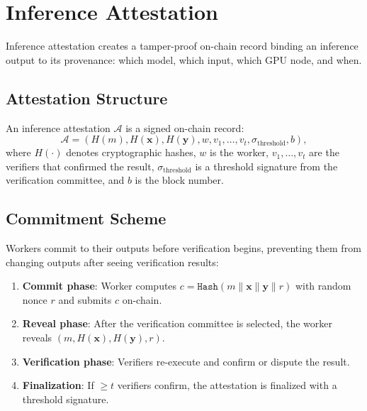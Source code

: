 \section{Inference Attestation}

\label{sec:attestation}

Inference attestation creates a tamper-proof on-chain record binding an
inference output to its provenance: which model, which input, which GPU node,
and when.

\subsection{Attestation Structure}

\begin{definition}
An inference attestation $\mathcal{A}$ is a signed on-chain record:
\begin{equation}
\mathcal{A} = \left(H(m), H(\mathbf{x}), H(\mathbf{y}), w, v_1, \ldots, v_t,
\sigma_{\text{threshold}}, b\right),
\end{equation}
where $H(\cdot)$ denotes cryptographic hashes, $w$ is the worker, $v_1,
\ldots, v_t$ are the verifiers that confirmed the result, $\sigma_{\text{threshold}}$
is a threshold signature from the verification committee, and $b$ is the block
number.
\end{definition}

\subsection{Commitment Scheme}

Workers commit to their outputs before verification begins, preventing them
from changing outputs after seeing verification results:

\begin{enumerate}[leftmargin=1.4em]
    \item \textbf{Commit phase}: Worker computes $c = \texttt{Hash}(m \|
    \mathbf{x} \| \mathbf{y} \| r)$ with random nonce $r$ and submits $c$
    on-chain.
    \item \textbf{Reveal phase}: After the verification committee is selected,
    the worker reveals $(m, H(\mathbf{x}), H(\mathbf{y}), r)$.
    \item \textbf{Verification phase}: Verifiers re-execute and confirm or
    dispute the result.
    \item \textbf{Finalization}: If $\geq t$ verifiers confirm, the attestation
    is finalized with a threshold signature.
\end{enumerate}

